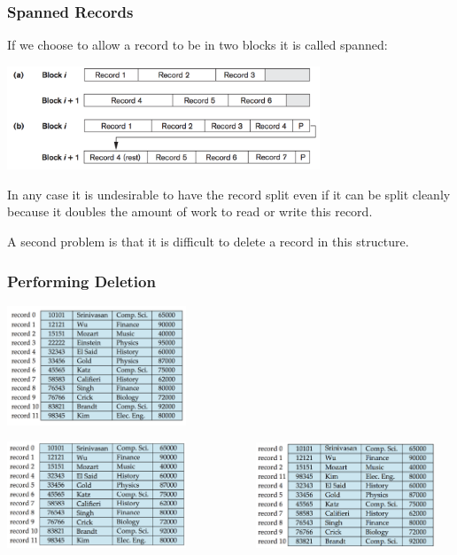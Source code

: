\begin{frame}
\frametitle{Spanned Records}

If we choose to allow a record to be in two blocks it is called \alert{spanned}:

\begin{center}
\includegraphics[width=0.7\textwidth]{images/spanned-unspanned}
\end{center}

In any case it is undesirable to have the record split even if it can be split cleanly because it doubles the amount of work to read or write this record.

A second problem is that it is difficult to delete a record in this structure.

\end{frame}



\begin{frame}
\frametitle{Performing Deletion}

\begin{center}
\includegraphics[width=0.4\textwidth]{images/instructor-1}
\end{center}



\begin{center}
\includegraphics[width=0.4\textwidth]{images/instructor-2} 
~~~~~~~~~~
\includegraphics[width=0.4\textwidth]{images/instructor-3}
\end{center}

\end{frame}



